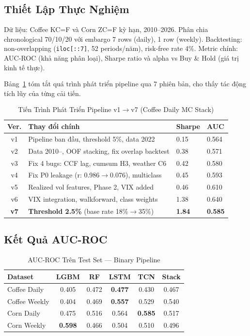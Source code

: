 \documentclass[conference]{IEEEtran}
\begin{document}
\subsection{Thiết Lập Thực Nghiệm}

Dữ liệu: Coffee KC=F và Corn ZC=F kỳ hạn, 2010--2026.
Phân chia chronological 70/10/20 với embargo 7 rows (daily), 1 row (weekly).
Backtesting: non-overlapping (\texttt{iloc[::7]}, 52 periods/năm),
risk-free rate 4\%. Metric chính: AUC-ROC (khả năng phân loại),
Sharpe ratio và alpha vs Buy \& Hold (giá trị kinh tế thực).

Bảng~\ref{tab:pipeline_evolution} tóm tắt quá trình phát triển pipeline
qua 7 phiên bản, cho thấy tác động tích lũy của từng cải tiến.

\begin{table}[htbp]
\caption{Tiến Trình Phát Triển Pipeline v1$\to$v7 (Coffee Daily MC Stack)}
\label{tab:pipeline_evolution}
\centering
\begin{tabular}{@{}clll@{}}
\toprule
\textbf{Ver.} & \textbf{Thay đổi chính} & \textbf{Sharpe} & \textbf{AUC} \\
\midrule
v1 & Pipeline ban đầu, threshold 5\%, data 2022 & 0.15 & 0.564 \\
v2 & Data 2010--, OOF stacking, fix overlap backtest & 0.38 & 0.571 \\
v3 & Fix 4 bugs: CCF lag, cumsum H3, weather C6 & 0.42 & 0.580 \\
v4 & Fix P0 leakage (r: 0.986$\to$0.076), multiclass & 0.45 & 0.593 \\
v5 & Realized vol features, Phase 2, VIX added & 0.46 & 0.610 \\
v6 & VIX integration, walkforward, class weights & 1.38 & 0.640 \\
\textbf{v7} & \textbf{Threshold 2.5\%} (base rate 18\%$\to$35\%) & \textbf{1.84} & \textbf{0.585} \\
\bottomrule
\end{tabular}
\end{table}

\subsection{Kết Quả AUC-ROC}

\begin{table}[htbp]
\caption{AUC-ROC Trên Test Set — Binary Pipeline}
\label{tab:auc}
\centering
\begin{tabular}{@{}lccccc@{}}
\toprule
\textbf{Dataset} & \textbf{LGBM} & \textbf{RF} & \textbf{LSTM} & \textbf{TCN} & \textbf{Stack} \\
\midrule
Coffee Daily  & 0.405 & 0.472 & \textbf{0.477} & 0.430 & 0.467 \\
Coffee Weekly & 0.404 & 0.469 & \textbf{0.557} & 0.529 & 0.540 \\
Corn Daily    & 0.475 & 0.516 & 0.564 & \textbf{0.585} & 0.517 \\
Corn Weekly   & \textbf{0.598} & 0.466 & 0.504 & 0.510 & 0.496 \\
\bottomrule
\end{tabular}
\end{table}
\end{document}
